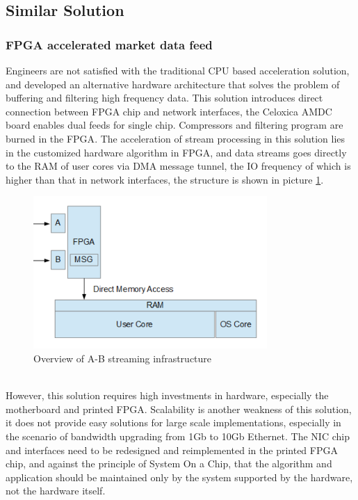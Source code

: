 \documentclass[11pt,openright,a4paper]{report}
\begin{document}
\subsection{Similar Solution}
\subsubsection{FPGA accelerated market data feed}
Engineers are not satisfied with the traditional CPU based acceleration solution, and developed an alternative hardware architecture that solves the problem of buffering and filtering high frequency data. This solution introduces direct connection between FPGA chip and network interfaces, the Celoxica AMDC board enables dual feeds for single chip. Compressors and filtering program are burned in the FPGA\cite{morris2009fpga}. The acceleration of stream processing in this solution lies in the customized hardware algorithm in FPGA, and data streams goes directly to the RAM of user cores via DMA message tunnel, the IO frequency of which is higher than that in network interfaces, the structure is shown in picture \ref{fig:4}.\\
\begin{figure}[htbp]
	\centering\includegraphics[width=3.5in]{picture/FPGAcall.png}
	\caption{Overview of A-B streaming infrastructure}
	\label{fig:4}
\end{figure}\\
However, this solution requires high investments in hardware, especially the motherboard and printed FPGA. Scalability is another weakness of this solution, it does not provide easy solutions for large scale implementations, especially in the scenario of bandwidth upgrading from 1Gb to 10Gb Ethernet. The NIC chip and interfaces need to be redesigned and reimplemented in the printed FPGA chip, and against the principle of System On a Chip, that the algorithm and application should be maintained only by the system supported by the hardware, not the hardware itself\cite{klaas2004system}.\\
\end{document}
